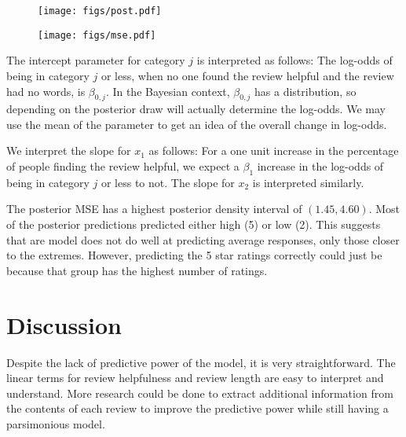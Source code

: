 \documentclass[12pt]{article}
\begin{document}
\begin{figure}
\begin{center}
\texttt{[image: figs/post.pdf]}
\end{center}
\end{figure}

\begin{figure}
\begin{center}
\texttt{[image: figs/mse.pdf]}
\end{center}
\end{figure}

\noindent The intercept parameter for category $j$ is interpreted as follows: The log-odds of being in category $j$ or less, when no one found the review helpful and the review had no words, is $\beta_{0,j}$. In the Bayesian context, $\beta_{0,j}$ has a distribution, so depending on the posterior draw will actually determine the log-odds. We may use the mean of the parameter to get an idea of the overall change in log-odds.
\bigskip

\noindent We interpret the slope for $x_1$ as follows: For a one unit increase in the percentage of people finding the review helpful, we expect a $\beta_1$ increase in the log-odds of being in category $j$ or less to not. The slope for $x_2$ is interpreted similarly.
\bigskip

\noindent The posterior MSE has a highest posterior density interval of $(1.45, 4.60)$. Most of the posterior predictions predicted either high (5) or low (2). This suggests that are model does not do well at predicting average responses, only those closer to the extremes. However, predicting the 5 star ratings correctly could just be because that group has the highest number of ratings.

\section*{Discussion}

\noindent Despite the lack of predictive power of the model, it is very straightforward. The linear terms for review helpfulness and review length are easy to interpret and understand. More research could be done to extract additional information from the contents of each review to improve the predictive power while still having a parsimonious model.
\end{document}
